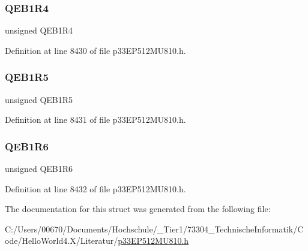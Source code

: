 \subsubsection{\texorpdfstring{Q\+E\+B1\+R4}{QEB1R4}}
{\footnotesize\ttfamily unsigned Q\+E\+B1\+R4}



Definition at line 8430 of file p33\+E\+P512\+M\+U810.\+h.

\mbox{\label{structtag_r_p_i_n_r14_b_i_t_s_a892b4d2e8c941bc10521af979081d92f}} 
\subsubsection{\texorpdfstring{Q\+E\+B1\+R5}{QEB1R5}}
{\footnotesize\ttfamily unsigned Q\+E\+B1\+R5}



Definition at line 8431 of file p33\+E\+P512\+M\+U810.\+h.

\mbox{\label{structtag_r_p_i_n_r14_b_i_t_s_a162c842cf3883ad348af16ee480d764b}} 
\subsubsection{\texorpdfstring{Q\+E\+B1\+R6}{QEB1R6}}
{\footnotesize\ttfamily unsigned Q\+E\+B1\+R6}



Definition at line 8432 of file p33\+E\+P512\+M\+U810.\+h.



The documentation for this struct was generated from the following file\+:\begin{DoxyCompactItemize}
\item 
C\+:/\+Users/00670/\+Documents/\+Hochschule/\+\_\+\+Tier1/73304\+\_\+\+Technische\+Informatik/\+Code/\+Hello\+World4.\+X/\+Literatur/\hyperlink{p33_e_p512_m_u810_8h}{p33\+E\+P512\+M\+U810.\+h}\end{DoxyCompactItemize}
